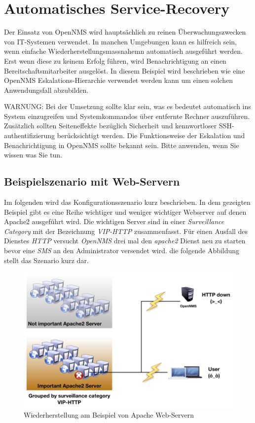 \section{Automatisches Service-Recovery}
Der Einsatz von OpenNMS wird hauptsächlich zu reinen Überwachungszwecken von IT-Systemen verwendet. In manchen Umgebungen kann es hilfreich sein, wenn einfache Wiederherstellungsmassnahemn automatisch ausgeführt werden. Erst wenn diese zu keinem Erfolg führen, wird Benachrichtigung an einen Bereitschaftsmitarbeiter ausgelöst. In diesem Beispiel wird beschrieben wie eine OpenNMS Eskalations-Hierarchie verwendet werden kann um einen solchen Anwendungsfall abzubilden.

WARNUNG: Bei der Umsetzung sollte klar sein, was es bedeutet automatisch ins System einzugreifen und Systemkommandos über entfernte Rechner auszuführen. Zusätzlich sollten Seiteneffekte bezüglich Sicherheit und kennwortloser SSH-authentifizierung berücksichtigt werden. Die Funktionsweise der Eskalation und Benachrichtigung in OpenNMS sollte bekannt sein. Bitte anwenden, wenn Sie wissen was Sie tun.


\subsection{Beispielszenario mit Web-Servern}
Im folgenden wird das Konfigurationsszenario kurz beschrieben. In dem gezeigten Beispiel gibt es eine Reihe wichtiger und weniger wichtiger Webserver auf denen Apache2 ausgeführt wird. Die wichtigen Server sind in einer \emph{Surveillance Category} mit der Bezeichnung \emph{VIP-HTTP} zusammenfasst. Für einen Ausfall des Dienstes \emph{HTTP} versucht \emph{OpenNMS} drei mal den \emph{apache2} Dienst neu zu starten bevor eine \emph{SMS} an den Administrator versendet wird. die folgende Abbildung stellt das Szenario kurz dar.

\begin{figure}[H]
	\centering
	\includegraphics[width=1.0\textwidth]{images/use-cases/service-recovery/szenario}
	\caption{Wiederherstellung am Beispiel von Apache Web-Servern}
	\label{pic:szenario-recovery-apache}
\end{figure}

